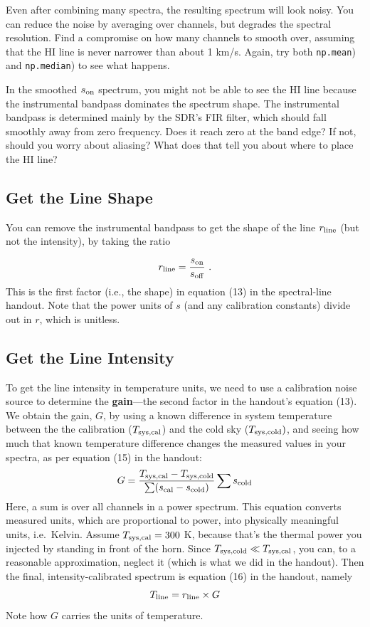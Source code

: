 \documentclass[11pt,preprint]{aastex}
\begin{document}
Even after combining many spectra, the resulting
spectrum will look noisy.  You can reduce the noise by averaging
over channels, but
degrades the spectral resolution. Find a compromise on
how many channels to smooth over, assuming that the HI line is
never narrower than about 1 km/s.
Again, try both {\tt np.mean}) and {\tt np.median}) to see what happens.

In the smoothed $s_{\rm on}$ spectrum, you might not be able to see the
HI line because the instrumental bandpass dominates the spectrum
shape. The instrumental bandpass is determined mainly by the SDR's FIR
filter, which should fall smoothly away from zero frequency.
Does it reach zero at the band edge? If not, should you worry about aliasing?
What does that tell you about where to place the HI line?

\subsection{Get the Line Shape}

You can remove the instrumental bandpass to get the shape
of the line $r_{\rm line}$ (but not the intensity), by taking the ratio 

\begin{equation}
r_{\rm line} = \frac{s_{\rm on}}{s_{\rm off}} \ .
\end{equation}
%
This is the first factor (i.e., the shape) in equation
(13) in the spectral-line handout. Note that the power units of $s$ (and any calibration constants) divide out in $r$, which is
unitless.
%
\subsection{Get the Line Intensity}

\noindent
To get the line intensity in temperature units, we need to use a calibration noise source
to determine the {\bf gain}---the second factor in
the handout's equation (13). We obtain the gain, $G$, by using a known
difference in system temperature between the 
the calibration ($T_{\rm sys,cal}$) and the cold sky ($T_{\rm sys,cold})$,
and seeing how much that known temperature difference changes
the measured values in your spectra,  as per equation (15)
in the handout:
%
\begin{equation}
G =
\frac{T_{\rm sys,cal} - T_{\rm sys,cold}}{\sum(s_{\rm cal} - s_{\rm cold})} 
\sum s_{\rm cold} 
\end{equation}
\noindent Here, a sum is over all channels in a power spectrum. This
equation converts measured units, which are proportional to power,
into physically meaningful units, i.e.\ Kelvin. Assume
$T_{\rm sys,cal} = 300$ K, because that's the thermal power you injected by
standing in front of the horn. Since $T_{\rm sys,cold} \ll
T_{\rm sys,cal}$, you can, to a reasonable approximation, neglect it (which is what we
did in the handout). Then the final, intensity-calibrated spectrum is
equation (16) in the handout, namely
\begin{equation}
T_{\rm line} = r_{\rm line} \times G
\end{equation}
Note how $G$ carries the units of temperature.
%
\end{document}
